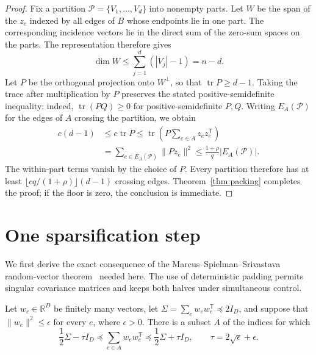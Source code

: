 \begin{proof}
Fix a partition $\mathcal P=\{V_1,\ldots,V_d\}$ into nonempty parts.
Let $W$ be the span of the $z_e$ indexed by all edges of $B$ whose
endpoints lie in one part.  The corresponding incidence vectors lie in
the direct sum of the zero-sum spaces on the parts.  The representation
therefore gives
\[
 \dim W\leq\sum_{j=1}^d(|V_j|-1)=n-d.
\]
Let $P$ be the orthogonal projection onto $W^\perp$, so that
$\operatorname{tr}P\geq d-1$.  Taking the trace after multiplication by
$P$ preserves the stated positive-semidefinite inequality: indeed,
$\operatorname{tr}(PQ)\geq0$ for positive-semidefinite $P,Q$.
Writing $E_A(\mathcal P)$ for the edges of $A$ crossing the partition,
we obtain
\begin{align*}
 c(d-1)
 &\leq c\operatorname{tr}P
 \leq\operatorname{tr}\left(P\sum_{e\in A}z_ez_e^{\mathsf T}\right)\\
 &=\sum_{e\in E_A(\mathcal P)}\|Pz_e\|^2
 \leq\frac{1+\rho}{q}|E_A(\mathcal P)|.
\end{align*}
The within-part terms vanish by the choice of $P$.  Every partition
therefore has at least $\lfloor cq/(1+\rho)\rfloor(d-1)$ crossing
edges.  Theorem~\ref{thm:packing} completes the proof; if the floor is
zero, the conclusion is immediate.
\end{proof}

\section{One sparsification step}
\label{sec:sparsification}

We first derive the exact consequence of the Marcus--Spielman--Srivastava
random-vector theorem~\cite[Theorem~1.4]{MSS}
needed here.  The use of deterministic padding permits singular
covariance matrices and keeps both halves under simultaneous control.

\begin{lemma}
\label{lemma:two-system-split}
Let $w_e\in\mathbb R^D$ be finitely many vectors, let
$\Sigma=\sum_e w_ew_e^{\mathsf T}\preceq2I_D$, and suppose that
$\|w_e\|^2\leq\epsilon$ for every $e$, where $\epsilon>0$.
There is a subset $A$ of the indices for which
\begin{equation}
 \frac12\Sigma-\tau I_D
 \preceq\sum_{e\in A}w_ew_e^{\mathsf T}
 \preceq\frac12\Sigma+\tau I_D,
 \qquad \tau=2\sqrt\epsilon+\epsilon.
 \label{eq:two-sided-split}
\end{equation}
\end{lemma}

